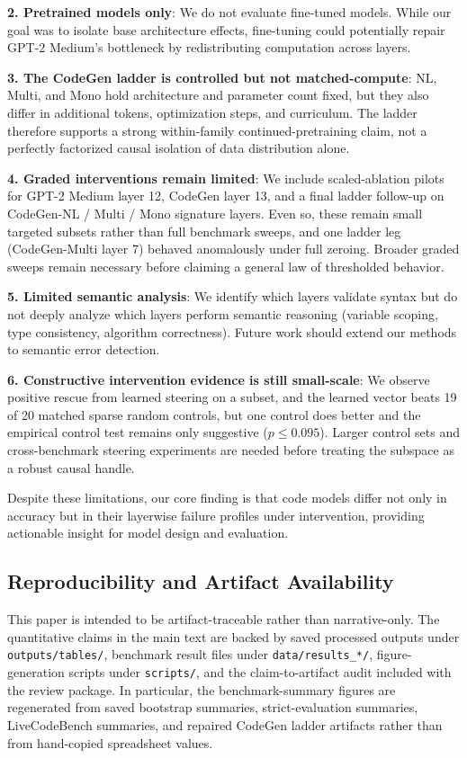 \documentclass[preprint,12pt,authoryear]{elsarticle}
\begin{document}
\textbf{2. Pretrained models only}: We do not evaluate fine-tuned models. While our goal was to isolate base architecture effects, fine-tuning could potentially repair GPT-2 Medium's bottleneck by redistributing computation across layers.

\textbf{3. The CodeGen ladder is controlled but not matched-compute}: NL, Multi, and Mono hold architecture and parameter count fixed, but they also differ in additional tokens, optimization steps, and curriculum. The ladder therefore supports a strong within-family continued-pretraining claim, not a perfectly factorized causal isolation of data distribution alone.

\textbf{4. Graded interventions remain limited}: We include scaled-ablation pilots for GPT-2 Medium layer 12, CodeGen layer 13, and a final ladder follow-up on CodeGen-NL / Multi / Mono signature layers. Even so, these remain small targeted subsets rather than full benchmark sweeps, and one ladder leg (CodeGen-Multi layer 7) behaved anomalously under full zeroing. Broader graded sweeps remain necessary before claiming a general law of thresholded behavior.

\textbf{5. Limited semantic analysis}: We identify which layers validate syntax but do not deeply analyze which layers perform semantic reasoning (variable scoping, type consistency, algorithm correctness). Future work should extend our methods to semantic error detection.

\textbf{6. Constructive intervention evidence is still small-scale}: We observe positive rescue from learned steering on a subset, and the learned vector beats 19 of 20 matched sparse random controls, but one control does better and the empirical control test remains only suggestive ($p \le 0.095$). Larger control sets and cross-benchmark steering experiments are needed before treating the subspace as a robust causal handle.

Despite these limitations, our core finding is that code models differ not only in accuracy but in their layerwise failure profiles under intervention, providing actionable insight for model design and evaluation.

\subsection{Reproducibility and Artifact Availability}

This paper is intended to be artifact-traceable rather than narrative-only. The quantitative claims in the main text are backed by saved processed outputs under \texttt{outputs/tables/}, benchmark result files under \texttt{data/results\_*/}, figure-generation scripts under \texttt{scripts/}, and the claim-to-artifact audit included with the review package. In particular, the benchmark-summary figures are regenerated from saved bootstrap summaries, strict-evaluation summaries, LiveCodeBench summaries, and repaired CodeGen ladder artifacts rather than from hand-copied spreadsheet values.
\end{document}
